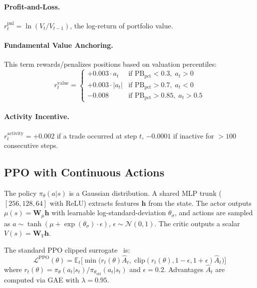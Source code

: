\documentclass[11pt,a4paper]{article}
\begin{document}
\paragraph{Profit-and-Loss.}
$r^{\text{pnl}}_t = \ln(V_t / V_{t-1})$, the log-return of portfolio value.

\paragraph{Fundamental Value Anchoring.}
This term rewards/penalizes positions based on valuation percentiles:
\begin{equation}
    r^{\text{value}}_t = \begin{cases}
        +0.003 \cdot a_t & \text{if } \text{PB}_{\text{pct}} < 0.3,\; a_t > 0 \\
        +0.003 \cdot |a_t| & \text{if } \text{PB}_{\text{pct}} > 0.7,\; a_t < 0 \\
        -0.008 & \text{if } \text{PB}_{\text{pct}} > 0.85,\; a_t > 0.5
    \end{cases}
\end{equation}

\paragraph{Activity Incentive.}
$r^{\text{activity}}_t = +0.002$ if a trade occurred at step $t$, $-0.0001$ if inactive for $>100$ consecutive steps.

\subsection{PPO with Continuous Actions}
\label{sec:ppo}

The policy $\pi_\theta(a|s)$ is a Gaussian distribution. A shared MLP trunk ($[256,128,64]$ with ReLU) extracts features $\mathbf{h}$ from the state. The actor outputs $\mu(s) = \mathbf{W}_\mu \mathbf{h}$ with learnable log-standard-deviation $\theta_\sigma$, and actions are sampled as $a \sim \tanh(\mu + \exp(\theta_\sigma) \cdot \epsilon)$, $\epsilon \sim \mathcal{N}(0,1)$. The critic outputs a scalar $V(s) = \mathbf{W}_V \mathbf{h}$.

The standard PPO clipped surrogate~\cite{schulman2017} is:
\begin{equation}
    \mathcal{L}^{\text{PPO}}(\theta) = \mathbb{E}_t\Big[\min\big(r_t(\theta)\hat{A}_t,\; \text{clip}(r_t(\theta), 1-\epsilon, 1+\epsilon)\hat{A}_t\big)\Big]
\end{equation}
where $r_t(\theta) = \pi_\theta(a_t|s_t) / \pi_{\theta_{\text{old}}}(a_t|s_t)$ and $\epsilon = 0.2$. Advantages $\hat{A}_t$ are computed via GAE with $\lambda = 0.95$.
\end{document}
